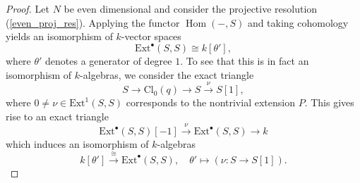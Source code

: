 \documentclass[10pt,a4paper]{amsart}
\DeclareMathOperator{\Hom}{Hom}
\newcommand{\evencl}{\mathrm{Cl}_0}
\begin{document}
\begin{proof}
    Let $N$ be even dimensional and consider the projective resolution (\ref{even_proj_res}). 
    Applying the functor $\Hom(-,S)$ and taking cohomology yields an isomorphism of $k$-vector spaces
    \begin{equation*}
        \mathrm{Ext}^{\bullet}(S,S) \cong k[\theta'], 
    \end{equation*}
    where $\theta'$ denotes a generator of degree $1$. To see that this is in fact an isomorphism of $k$-algebras, we consider the exact triangle 
    \begin{equation*}
         S \longrightarrow \evencl(q) \longrightarrow S\overset{\nu}{\longrightarrow} S[1],
    \end{equation*}
    where $0\neq \nu \in \mathrm{Ext}^1(S,S)$ corresponds to the nontrivial extension $P$. This gives rise to an exact triangle
    \begin{equation*}
        \mathrm{Ext}^{\bullet}(S,S)[-1] \overset{\nu}{\longrightarrow} \mathrm{Ext}^{\bullet}(S,S) \longrightarrow k
    \end{equation*}
    which induces an isomorphism of $k$-algebras 
    \begin{equation*}
        k[\theta'] \overset{\cong}{\longrightarrow}\mathrm{Ext}^{\bullet}(S,S), \quad \theta' \mapsto (\nu\colon S \to S[1]).
    \end{equation*}
\end{proof}
\end{document}
